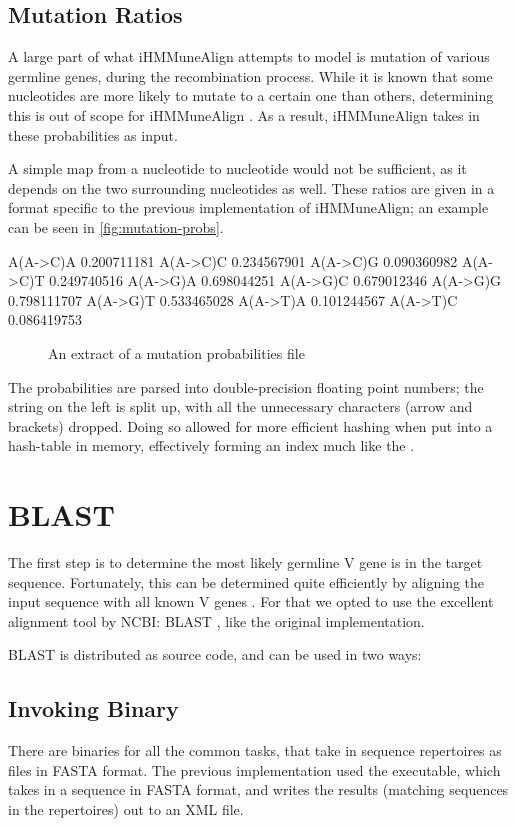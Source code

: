 \subsection{Mutation Ratios}
A large part of what iHMMuneAlign attempts to model is mutation of various germline genes, during the recombination process. While it is known that some nucleotides are more likely to mutate to a certain one than others, determining this is out of scope for iHMMuneAlign \autocite{iHMMuneAlign}. As a result, iHMMuneAlign takes in these probabilities as input.

A simple map from a nucleotide to nucleotide would not be sufficient, as it depends on the two surrounding nucleotides as well. These ratios are given in a format specific to the previous implementation of iHMMuneAlign; an example can be seen in \autoref{fig:mutation-probs}.

\begin{verbbox}
A(A->C)A 	0.200711181
A(A->C)C 	0.234567901
A(A->C)G 	0.090360982
A(A->C)T 	0.249740516
A(A->G)A 	0.698044251
A(A->G)C 	0.679012346
A(A->G)G 	0.798111707
A(A->G)T 	0.533465028
A(A->T)A 	0.101244567
A(A->T)C 	0.086419753
\end{verbbox}

\begin{figure}
    \centering
    \theverbbox
    \caption{An extract of a mutation probabilities file}
    \label{fig:mutation-probs}
\end{figure}

The probabilities are parsed into double-precision floating point numbers; the string on the left is split up, with all the unnecessary characters (arrow and brackets) dropped. Doing so allowed for more efficient hashing when put into a hash-table in memory, effectively forming an index much like the .

\section{BLAST}
\label{sec:blast-impl}
The first step is to determine the most likely germline V gene is in the target sequence. Fortunately, this can be determined quite efficiently by aligning the input sequence with all known V genes \cite{iHMMuneAlign}. For that we opted to use the excellent alignment tool by NCBI: BLAST \cite{blast}, like the original implementation.

BLAST is distributed as source code, and can be used in two ways:
\subsection{Invoking Binary}
\label{sec:blast-bin}
There are binaries for all the common tasks, that take in sequence repertoires as files in FASTA \autocite{fasta} format. The previous implementation used the  executable, which takes in a sequence in FASTA format, and writes the results (matching sequences in the repertoires) out to an XML file.

